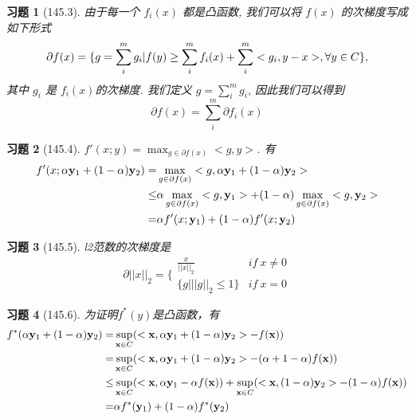 \documentclass[a4paper, UTF8]{ctexart}
\newtheorem*{exercise}{\textbf{习题}}
\begin{document}
	\begin{exercise}[145.3]
		由于每一个 $f_i(x)$ 都是凸函数, 我们可以将 $f(x)$ 的次梯度写成如下形式
		\begin{equation}
		\notag
		\begin{split}
		\partial f(x) = \{g = \sum_i^m g_i | f(y) \ge \sum_i^m f_i(x) + \sum_i^m<g_i, y-x>, \forall y \in C\},
		\end{split}
		\end{equation}
		其中 $g_i$ 是 $f_i(x)$的次梯度. 我们定义 $g = \sum_i^m g_i$, 因此我们可以得到
		\begin{equation}
		\partial f(x) = \sum_i^m \partial f_i(x)
		\end{equation}
	\end{exercise}

	\begin{exercise}[145.4]
		$f'(x;y) = \max_{g \in \partial f(x)} <g, y>$. 有
		\begin{equation}
		\notag
		\begin{split}
		f'(x; \alpha \mathbf{y}_1 + (1 - \alpha) \mathbf{y}_2) = & \max_{g \in \partial f(x)} <g, \alpha \mathbf{y}_1 + (1 - \alpha) \mathbf{y}_2> \\
		\leq & \alpha \max_{g \in \partial f(x)} <g, \mathbf{y}_1> + (1 - \alpha)\max_{g \in \partial f(x)} <g, \mathbf{y}_2> \\
		= & \alpha f'(x;\mathbf{y}_1) + (1 - \alpha) f'(x;\mathbf{y}_2)
		\end{split}
		\end{equation}
	\end{exercise}

	\begin{exercise}[145.5]
		l2范数的次梯度是 
		\begin{equation}
		\partial ||x||_2 = \lbrace 
		\begin{array}{cc}
		\frac{x}{||x||_2} & if \ x \neq 0 \\
		\{g | ||g||_2 \leq 1\} & if \ x = 0
		\end{array}
		\end{equation}
	\end{exercise}

	\begin{exercise}[145.6]
		为证明$f^*(y)$是凸函数，有 
		\begin{equation}
		\notag
		\begin{split}
		f^*(\alpha \mathbf{y}_1 + (1 - \alpha) \mathbf{y}_2) = & \sup_{\mathbf{x} \in C}(<\mathbf{x}, \alpha \mathbf{y}_1 + (1 - \alpha) \mathbf{y}_2> - f(\mathbf{x})) \\
		= & \sup_{\mathbf{x} \in C}(<\mathbf{x}, \alpha \mathbf{y}_1 + (1 - \alpha) \mathbf{y}_2> - (\alpha + 1 - \alpha)f(\mathbf{x})) \\
		\leq & \sup_{\mathbf{x} \in C}(<\mathbf{x}, \alpha \mathbf{y}_1 - \alpha f(\mathbf{x})) + \sup_{\mathbf{x} \in C}(<\mathbf{x}, (1 - \alpha) \mathbf{y}_2> - (1 - \alpha)f(\mathbf{x})) \\
		= & \alpha f^*(\mathbf{y}_1) + (1 - \alpha) f^*(\mathbf{y}_2)
		\end{split}
		\end{equation}
	\end{exercise}
\end{document}
